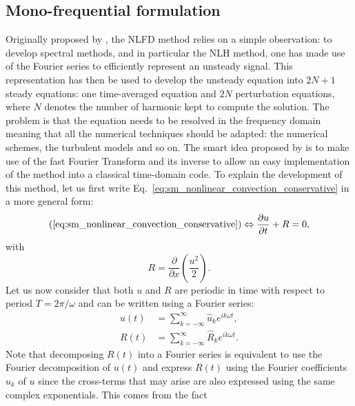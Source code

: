 
\subsection{Mono-frequential formulation}

Originally proposed by \citet{McMullen2001}, the NLFD
method relies on a simple observation: to develop spectral methods, and in
particular the NLH method, one has made use of the Fourier
series to efficiently represent an unsteady signal.
This representation has then be used to develop the unsteady
equation into $2N+1$ steady equations: one time-averaged equation
and $2N$ perturbation equations, 
where $N$ denotes the number
of harmonic kept to compute the solution.
The problem is that the equation needs to be 
resolved in the frequency domain meaning
that all the numerical techniques should be adapted: the numerical schemes,
the turbulent models and so on. The smart idea 
proposed by \citet{McMullen2001} is to
make use of the fast Fourier Transform and its inverse to
allow an easy implementation of the method into a classical time-domain code.
To explain the development of this method, let us first 
write Eq.~\eqref{eq:sm_nonlinear_convection_conservative} 
in a more general form:
\begin{equation}
	(\ref{eq:sm_nonlinear_convection_conservative})
	\Leftrightarrow
	\frac{\partial u}{\partial t} + R = 0,
	\label{eq:sm_nonlinear_convection_residual}
\end{equation}
with
\begin{equation}
	R = \frac{\partial}{\partial x} \left( 
	\frac{u^2}{2} \right).
\end{equation}
Let us now consider that both $u$ and $R$ are periodic
in time with respect to period $T = 2 \pi / \omega$
and can be written using a Fourier series:
\begin{equation}
	\begin{split}
		u(t) &= \sum_{k=-\infty}^{\infty} \widehat{u}_k e^{i k \omega t}, \\
		R(t) &= \sum_{k=-\infty}^{\infty} \widehat{R}_k e^{i k \omega t}.
	\end{split}
\end{equation}
Note that decomposing $R(t)$ into a Fourier series is equivalent
to use the Fourier decomposition of $u(t)$ and express
$R(t)$ using the Fourier coefficients $\widehat{u}_k$ of $u$
since the cross-terms that may arise are also expressed 
using the same complex exponentials. This comes from the fact

